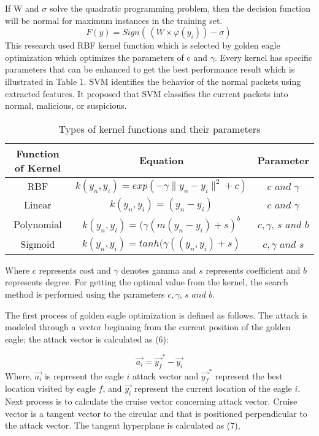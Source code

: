 \documentclass[conference]{IEEEtran}
\begin{document}
If W and $\sigma$ solve the quadratic programming problem, then the decision function will be normal for
maximum instances in the training set.
\begin{equation}
F(y) = Sign(  \,( W \times \varphi(y_i)) - \sigma)  \,
\end{equation}
This research used RBF kernel function which is selected by golden eagle optimization which
optimizes the parameters of c and $\gamma$. Every kernel has specific parameters that can be enhanced to get the best
performance result which is illustrated in Table 1. SVM identifies the behavior of the normal packets using
extracted features. It proposed that SVM classifies the current packets into normal, malicious, or suspicious.

\begin{table}[h!]
\centering
\caption{Types of kernel functions and their parameters}
\label{table:1}
\begin{tabular}{|c|c|c|}
\hline
\textbf{Function of Kernel} & \textbf{Equation} & \textbf{Parameter} \\
\hline
RBF & $k(y_n, y_i) = exp( -\gamma\| y_n - y_i \|^2+c)$ &$c$ $and$ $\gamma$ \\
\hline
Linear &$k(y_n, y_i) = ( y_n - y_i)$ & $c$ $and$ $\gamma$ \\
\hline
Polynomial & $k(y_n, y_i) = (\gamma( m (y_n - y_i) + s)^b$ &$ c, \gamma$, $s$ $and$ $b$\\
\hline
Sigmoid & $k(y_n, y_i) = tanh(\gamma((y_n, y_i) + s)$ &$ c, \gamma$   $and$ $ s$\\
\hline
\end{tabular}
\end{table}
Where $c$ represents cost and $\gamma$ denotes gamma and $s$ represents coefficient and $b$ represents degree. For
getting the optimal value from the kernel, the search method is performed using the parameters $ c, \gamma$, $s$ $and$ $b$.

The first process of golden eagle optimization is defined as follows. The attack is modeled through a
vector beginning from the current position of the golden eagle; the attack vector is calculated as (6):

\begin{equation}
\overrightarrow{a_i} = \overrightarrow{y_f}^* - \overrightarrow{y_i}
\end{equation}
Where, $\overrightarrow{a_i}$ is represent the eagle $i$ attack vector and $\overrightarrow{y_f}^*$ represent the best location visited by eagle $f$, and $\overrightarrow{y_i}$ represent the current location of the eagle $i$. Next process is to calculate the cruise vector concerning attack vector. Cruise vector is a tangent vector to the circular and that is positioned perpendicular to the attack vector. The tangent hyperplane is calculated as (7),
\end{document}
